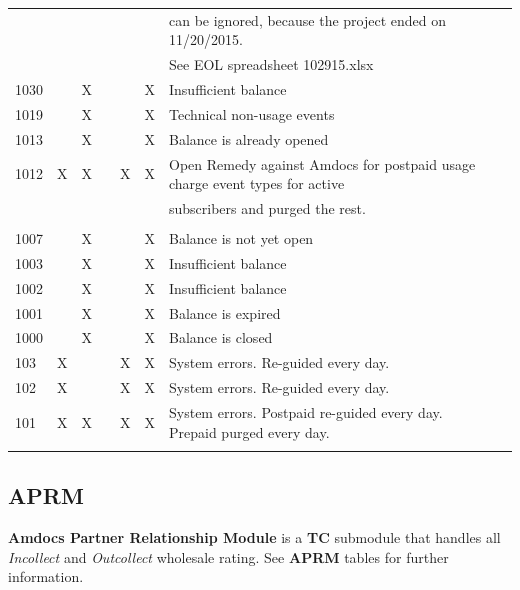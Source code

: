 \documentclass[12pt,twoside]{article}
\begin{document}
\begin{landscape}
\begin{longtable}{l|l|l|l|l|l|l|l|l}
&  &  &  &  &  & can be ignored, because the project ended on 11/20/2015.\\
&  &  &  &  &  & See   EOL spreadsheet 102915.xlsx\\
1030 &  & X &  &  & X & Insufficient balance\\
1019 &  & X &  &  & X & Technical non-usage events\\
1013 &  & X &  &  & X & Balance is already opened\\
1012 & X & X &  & X & X & Open Remedy against Amdocs for postpaid usage charge event types for active\\
&  &  &  &  &  & subscribers and purged the rest.\\
&  &  &  &  &  & \\
1007 &  & X &  &  & X & Balance is not yet open\\
1003 &  & X &  &  & X & Insufficient balance\\
1002 &  & X &  &  & X & Insufficient balance\\
1001 &  & X &  &  & X & Balance is expired\\
1000 &  & X &  &  & X & Balance is closed\\
103 & X &  &  & X & X & System errors. Re-guided every day.\\
102 & X &  &  & X & X & System errors. Re-guided every day.\\
101 & X & X &  & X & X & System errors. Postpaid re-guided every day.  Prepaid purged every day.\\
&  &  &  &  &  & \\
\hline
\end{longtable}
\end{landscape} 
\newpage
\normalsize

\subsection{APRM}
\label{sec:orgheadline8}
\textbf{Amdocs Partner Relationship Module} is a \textbf{TC} submodule that handles all \emph{Incollect} and \emph{Outcollect} wholesale rating. See \textbf{APRM} tables for further information.
\end{document}
